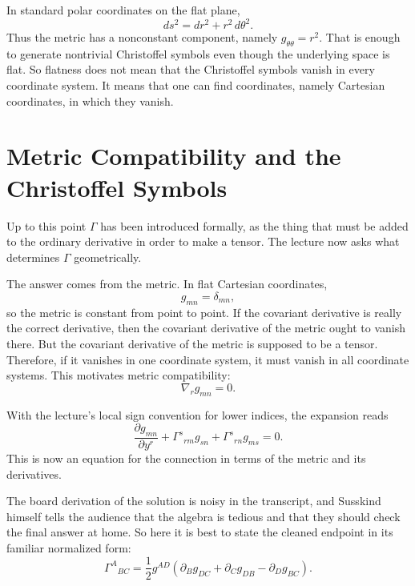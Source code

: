 In standard polar coordinates on the flat plane,
\begin{equation}
ds^2=dr^2+r^2\,d\theta^2.
\end{equation}
Thus the metric has a nonconstant component, namely \(g_{\theta\theta}=r^2\). That is enough to generate nontrivial Christoffel symbols even though the underlying space is flat. So flatness does not mean that the Christoffel symbols vanish in every coordinate system. It means that one can find coordinates, namely Cartesian coordinates, in which they vanish.

\section{Metric Compatibility and the Christoffel Symbols}

Up to this point \(\Gamma\) has been introduced formally, as the thing that must be added to the ordinary derivative in order to make a tensor. The lecture now asks what determines \(\Gamma\) geometrically.

The answer comes from the metric. In flat Cartesian coordinates,
\begin{equation}
g_{mn}=\delta_{mn},
\end{equation}
so the metric is constant from point to point. If the covariant derivative is really the correct derivative, then the covariant derivative of the metric ought to vanish there. But the covariant derivative of the metric is supposed to be a tensor. Therefore, if it vanishes in one coordinate system, it must vanish in all coordinate systems. This motivates metric compatibility:
\begin{equation}
\nabla_r g_{mn}=0.
\end{equation}

With the lecture's local sign convention for lower indices, the expansion reads
\begin{equation}
\frac{\partial g_{mn}}{\partial y^r}
+
\Gamma^s{}_{rm}g_{sn}
+
\Gamma^s{}_{rn}g_{ms}
=
0.
\end{equation}
This is now an equation for the connection in terms of the metric and its derivatives.

The board derivation of the solution is noisy in the transcript, and Susskind himself tells the audience that the algebra is tedious and that they should check the final answer at home. So here it is best to state the cleaned endpoint in its familiar normalized form:
\begin{equation}
\Gamma^A{}_{BC}
=
\frac{1}{2}g^{AD}
\left(
\partial_B g_{DC}
+
\partial_C g_{DB}
-
\partial_D g_{BC}
\right).
\end{equation}

